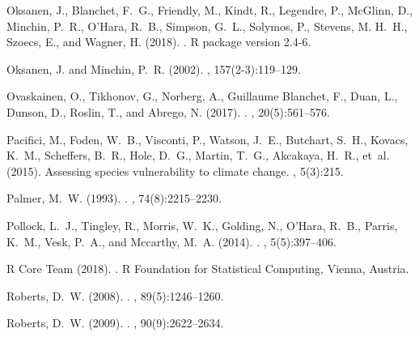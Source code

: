 \documentclass[a4paper,11pt]{article}
\begin{document}
\begin{thebibliography}{}
Oksanen, J., Blanchet, F.~G., Friendly, M., Kindt, R., Legendre, P., McGlinn,
  D., Minchin, P.~R., O'Hara, R.~B., Simpson, G.~L., Solymos, P., Stevens, M.
  H.~H., Szoecs, E., and Wagner, H. (2018).
.
\newblock R package version 2.4-6.

Oksanen, J. and Minchin, P.~R. (2002).
, 157(2-3):119--129.

Ovaskainen, O., Tikhonov, G., Norberg, A., {Guillaume Blanchet}, F., Duan, L.,
  Dunson, D., Roslin, T., and Abrego, N. (2017).
.
, 20(5):561--576.

Pacifici, M., Foden, W.~B., Visconti, P., Watson, J.~E., Butchart, S.~H.,
  Kovacs, K.~M., Scheffers, B.~R., Hole, D.~G., Martin, T.~G., Akcakaya, H.~R.,
  et~al. (2015).
\newblock Assessing species vulnerability to climate change.
, 5(3):215.

Palmer, M.~W. (1993).
.
, 74(8):2215--2230.

Pollock, L.~J., Tingley, R., Morris, W.~K., Golding, N., O'Hara, R.~B., Parris,
  K.~M., Vesk, P.~A., and Mccarthy, M.~A. (2014).
.
, 5(5):397--406.

{R Core Team} (2018).
.
\newblock R Foundation for Statistical Computing, Vienna, Austria.

Roberts, D.~W. (2008).
.
, 89(5):1246--1260.

Roberts, D.~W. (2009).
.
, 90(9):2622--2634.


\end{thebibliography}
\end{document}

